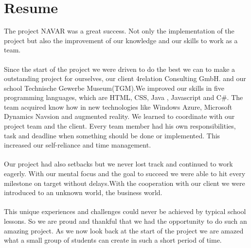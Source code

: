 \chapter{Resume}\label{chapter:Resume}
The project NAVAR was a great success. Not only the implementation of the project but also the improvement of our knowledge and our skills to work as a team.
\\\\
Since the start of the project we were driven to do the best we can to make a outstanding project for ourselves, our client 4relation Consulting GmbH. and our school Technische Gewerbe Museum(TGM).We improved our skills in five programming languages, which are HTML, CSS, Java , Javascript and C\#. The team acquired know how in new technologies like Windows Azure, Microsoft Dynamics Navsion and augmented reality.   
We learned to coordinate with our project team and the client. Every team member had his own responsibilities, task and deadline when something should be done or implemented. This increased our self-reliance and time management.
\\\\
Our project had also setbacks but we never lost track and continued to work eagerly. With our mental focus and the goal to succeed we were able to hit every milestone on target without delays.With the cooperation with our client we were introduced to an unknown world, the business world. 
\\\\
This unique experiences and challenges could never be achieved by typical school lessons. So we are proud and thankful that we had the opportunity to do such an amazing project. As we now look back at the start of the project we are amazed what a small group of students can create in such a short period of time.                 

